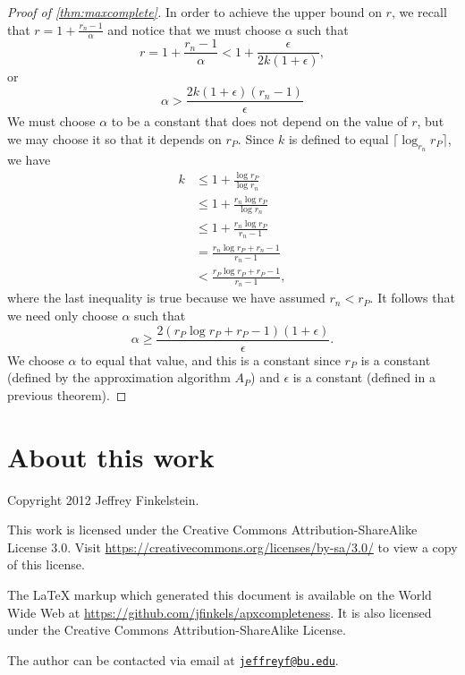 \documentclass[]{article}
\theoremstyle{plain}
\theoremstyle{definition}
\newcommand{\ceil}[1]{\lceil{#1}\rceil}
\newcommand{\email}[1]{\href{mailto:#1}{\nolinkurl{#1}}}
\begin{document}
\begin{proof}[Proof of \autoref{thm:maxcomplete}]
  In order to achieve the upper bound on $r$, we recall that $r = 1 + \frac{r_n - 1}{\alpha}$ and notice that we must choose $\alpha$ such that
  \begin{equation*}
    r = 1 + \frac{r_n - 1}{\alpha} < 1 + \frac{\epsilon}{2k(1 + \epsilon)},
  \end{equation*}
  or
  \begin{equation*}
    \alpha > \frac{2k(1 + \epsilon)(r_n - 1)}{\epsilon}
  \end{equation*}
  We must choose $\alpha$ to be a constant that does not depend on the value of $r$, but we may choose it so that it depends on $r_P$.
  Since $k$ is defined to equal $\ceil{\log_{r_n}{r_P}}$, we have
  \begin{align*}
    k & \leq 1 + \frac{\log{r_P}}{\log{r_n}} \\
    & \leq 1 + \frac{r_n \log{r_P}}{\log{r_n}} \\
    & \leq 1 + \frac{r_n \log{r_P}}{r_n - 1} \\
    & = \frac{r_n \log{r_P} + r_n - 1}{r_n - 1} \\
    & < \frac{r_P \log{r_P} + r_P - 1}{r_n - 1},
  \end{align*}
  where the last inequality is true because we have assumed $r_n < r_P$.
  It follows that we need only choose $\alpha$ such that
  \begin{equation*}
    \alpha \geq \frac{2(r_P \log{r_P} + r_P - 1)(1 + \epsilon)}{\epsilon}.
  \end{equation*}
  We choose $\alpha$ to equal that value, and this is a constant since $r_P$ is a constant (defined by the approximation algorithm $A_P$) and $\epsilon$ is a constant (defined in a previous theorem).
\end{proof}

\section*{About this work}

Copyright 2012 Jef{}frey Finkelstein.

This work is licensed under the Creative Commons Attribution-ShareAlike License 3.0.
Visit \mbox{\url{https://creativecommons.org/licenses/by-sa/3.0/}} to view a copy of this license.

The \LaTeX{} markup which generated this document is available on the World Wide Web at \mbox{\url{https://github.com/jfinkels/apxcompleteness}}.
It is also licensed under the Creative Commons Attribution-ShareAlike License.

The author can be contacted via email at \email{jeffreyf@bu.edu}.



\end{document}
